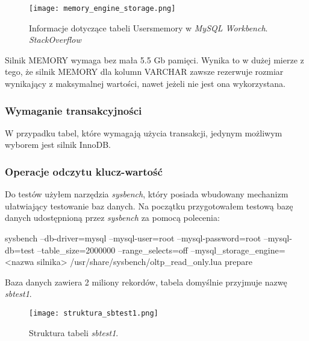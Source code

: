 \begin{figure}[!h]
	\caption{Informacje dotyczące tabeli Users\textunderscore memory w \textit{MySQL Workbench}. \textit{StackOverflow}}
	\centering
	\texttt{[image: memory\_engine\_storage.png]}
	\label{fig:label}
\end{figure}
Silnik MEMORY wymaga bez mała 5.5 Gb pamięci. Wynika to w dużej mierze z tego, że silnik MEMORY dla kolumn VARCHAR zawsze rezerwuje rozmiar wynikający z maksymalnej wartości, nawet jeżeli nie jest ona wykorzystana.




\subsubsection{Wymaganie transakcyjności}
W przypadku tabel, które wymagają użycia transakcji, jedynym możliwym wyborem jest silnik InnoDB.

\subsubsection{Operacje odczytu klucz-wartość}
Do testów użyłem narzędzia \textit{sysbench}, który posiada wbudowany mechanizm ułatwiający testowanie baz danych. Na początku przygotowałem testową bazę danych udostępnioną przez \textit{sysbench} za pomocą polecenia:
\begin{spverbatim}
	sysbench --db-driver=mysql --mysql-user=root --mysql-password=root --mysql-db=test --table_size=2000000 --range_selects=off --mysql_storage_engine=
	<nazwa silnika> /usr/share/sysbench/oltp_read_only.lua prepare
\end{spverbatim} 
Baza danych zawiera 2 miliony rekordów, tabela domyślnie przyjmuje nazwę \textit{sbtest1}.
\begin{figure}[H]
	\caption{Struktura tabeli \textit{sbtest1}.}
	\centering
	\texttt{[image: struktura\_sbtest1.png]}
	\label{fig:label}
\end{figure}

